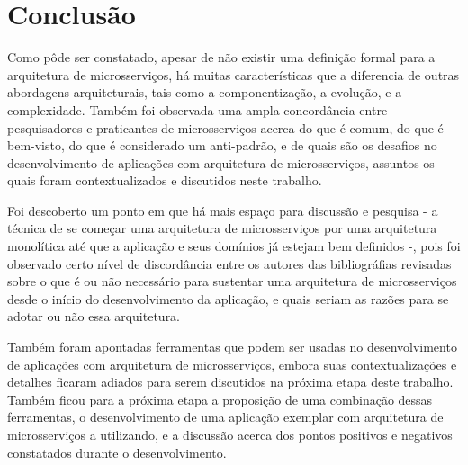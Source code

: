 \chapter{Conclusão}\label{chapter-conclusao}

Como pôde ser constatado, apesar de não existir uma definição formal para a arquitetura de microsserviços, há muitas características que a diferencia de outras abordagens arquiteturais, tais como a componentização, a evolução, e a complexidade. Também foi observada uma ampla concordância entre pesquisadores e praticantes de microsserviços acerca do que é comum, do que é bem-visto, do que é considerado um anti-padrão, e de quais são os desafios no desenvolvimento de aplicações com arquitetura de microsserviços, assuntos os quais foram contextualizados e discutidos neste trabalho. 

Foi descoberto um ponto em que há mais espaço para discussão e pesquisa - a técnica de se começar uma arquitetura de microsserviços por uma arquitetura monolítica até que a aplicação e seus domínios já estejam bem definidos -, pois foi observado certo nível de discordância entre os autores das bibliográfias revisadas sobre o que é ou não necessário para sustentar uma arquitetura de microsserviços desde o início do desenvolvimento da aplicação, e quais seriam as razões para se adotar ou não essa arquitetura.

Também foram apontadas ferramentas que podem ser usadas no desenvolvimento de aplicações com arquitetura de microsserviços, embora suas contextualizações e detalhes ficaram adiados para serem discutidos na próxima etapa deste trabalho. Também ficou para a próxima etapa a proposição de uma combinação dessas ferramentas, o desenvolvimento de uma aplicação exemplar com arquitetura de microsserviços a utilizando, e a discussão acerca dos pontos positivos e negativos constatados durante o desenvolvimento.


